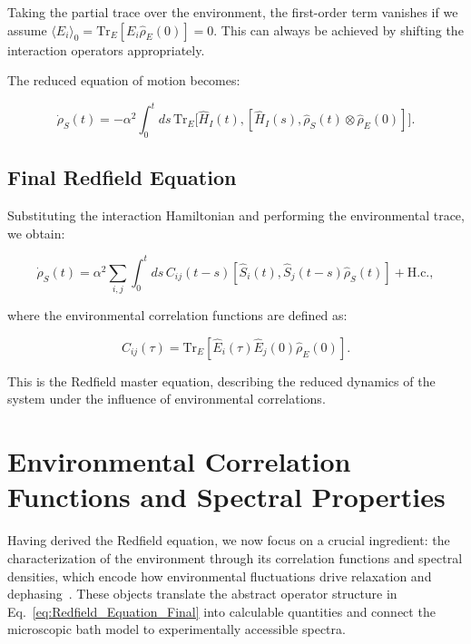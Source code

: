 Taking the partial trace over the environment, the first-order term vanishes if we assume $\langle E_i \rangle_0 = \mathrm{Tr}_E[E_i \hat{\rho}_E(0)] = 0$. This can always be achieved by shifting the interaction operators appropriately.

The reduced equation of motion becomes:

\begin{equation}
	\dot{\rho}_S(t) = - \alpha^2 \int_0^t ds \, \mathrm{Tr}_E \big[\hat{H}_I(t), [\hat{H}_I(s), \hat{\rho}_S(t) \otimes \hat{\rho}_E(0)]\big].
	\label{eq:Partial_Trace_Derivation}
\end{equation}

\subsection{Final Redfield Equation}

Substituting the interaction Hamiltonian and performing the environmental trace, we obtain:

\begin{equation}
	\dot{\rho}_S(t) = \alpha^2 \sum_{i,j} \int_0^t ds \, C_{ij}(t-s) \left[ \hat{S}_i(t), \hat{S}_j(t-s) \hat{\rho}_S(t) \right] + \text{H.c.},
	\label{eq:Redfield_Equation_Final}
\end{equation}

where the environmental correlation functions are defined as:

\begin{equation}
	C_{ij}(\tau) = \mathrm{Tr}_E[\hat{E}_i(\tau) \hat{E}_j(0) \hat{\rho}_E(0)].
	\label{eq:Environment_Correlation_Function}
\end{equation}

This is the Redfield master equation, describing the reduced dynamics of the system under the influence of environmental correlations.


\section{Environmental Correlation Functions and Spectral Properties}
\label{sec:environmental_correlation_functions}

Having derived the Redfield equation, we now focus on a crucial ingredient: the characterization of the environment through its correlation functions and spectral densities, which encode how environmental fluctuations drive relaxation and dephasing~\cite{breuerpetruccione2009theoryopenquantum, weiss2012quantumdissipativesystems}. These objects translate the abstract operator structure in Eq.~\eqref{eq:Redfield_Equation_Final} into calculable quantities and connect the microscopic bath model to experimentally accessible spectra.

